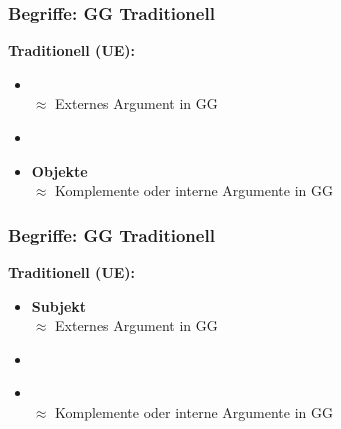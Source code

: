\begin{frame}
\frametitle{Begriffe: GG \vs Traditionell}

\begin{minipage}[b]{0.4\textwidth}

	\textbf{Traditionell (UE):}
		\begin{itemize}
		\item {}\\
		$\approx$ Externes Argument in GG
		\item[]
		\item \textbf{Objekte}\\
		$\approx$ Komplemente oder interne Argumente in GG
		\end{itemize}	
\end{minipage}  
\begin{minipage}[b]{0.55\textwidth}
	\begin{figure}
	\centering
	\end{figure}	
\end{minipage}

\end{frame}


\begin{frame}
\frametitle{Begriffe: GG \vs Traditionell}

\begin{minipage}[b]{0.4\textwidth}
	\footnotesize
	\textbf{Traditionell (UE):}
		\begin{itemize}
		\item \textbf{Subjekt}\\
		$\approx$ Externes Argument in GG
		\item[]
		\item {}\\
		$\approx$ Komplemente oder interne Argumente in GG
		\end{itemize}	
  	\end{minipage}  
	\begin{minipage}[b]{0.55\textwidth}
		\begin{figure}
	\centering
	
	\end{figure}
\end{minipage}

\end{frame}


